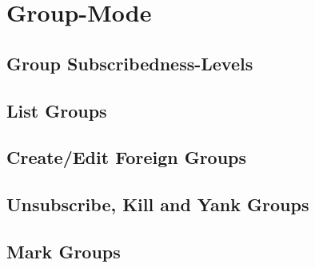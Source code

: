 \documentclass{article}
\begin{document}
\newlength{\logowidth}
\setlength{\logowidth}{6.861in}
\newlength{\logoheight}
\setlength{\logoheight}{7.013in}

\def\progver{5.8}\def\refver{5.8} %
\def\date{26th of March 2000}
\def\author{Vladimir Alexiev $<$vladimir@cs.ualberta.ca$>$}
\raggedbottom\raggedright
%


\twocolumn
\scriptsize
\pagestyle{plain}



\Title
\par
{}
\Notes
%
%
\section*{Group-Mode}
\GroupModeGeneral
	\subsection*{Group Subscribedness-Levels}
	\GroupLevels
	\subsection*{List Groups}
	\ListGroups
	\subsection*{Create/Edit Foreign Groups}
	\CreateEditGroups
	\subsection*{Unsubscribe, Kill and Yank Groups}
	\SubscribeKillYankGroups
	\subsection*{Mark Groups}
	\MarkGroups
\end{document}
